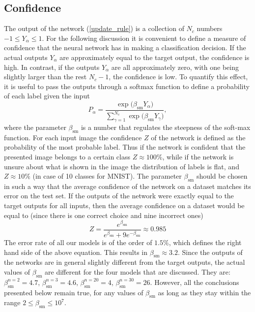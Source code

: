 \documentclass[12pt]{article} %
\begin{document}
\subsection*{Confidence}
The output of the network (\ref{update_rule}) is a collection of $N_c$ numbers $-1\leq Y_\alpha\leq 1$. For the following discussion it is convenient to define a measure of confidence that the neural network has in making a classification decision. If the actual outputs $Y_\alpha$ are approximately equal to the target output, the confidence is high. In contrast, if the outputs $Y_\alpha$ are all approximately zero, with one being slightly larger than the rest $N_c-1$, the confidence is low. To quantify this effect, it is useful to pass the outputs through a softmax function to define a probability of each label given the input
$$
P_\alpha = \frac{\exp\big(\beta_{\text{sm}} Y_\alpha\big)}{\sum\limits_{\gamma=1}^{N_c} \exp\big(\beta_{\text{sm}} Y_\gamma\big)},
$$ 
where the parameter $\beta_{\text{sm}}$ is a number that regulates the steepness of the soft-max function. For each input image the confidence $Z$ of the network is defined as the probability of the most probable label. Thus if the network is confident that the presented image belongs to a certain class $Z \approx 100\%$, while if the network is unsure about what is shown in the image the distribution of labels is flat, and $Z \approx 10\%$ (in case of 10 classes for MNIST). The parameter $\beta_{\text{sm}}$ should be chosen in such a way that the average confidence of the network on a dataset matches its error on the test set. If the outputs of the network were exactly equal to the target outputs for all inputs, then the average confidence on a dataset would be equal to (since there is one correct choice and nine incorrect ones)
$$
Z=\frac{e^{\beta_{\text{sm}}}}{e^{\beta_{\text{sm}}} + 9 e^{-\beta_{\text{sm}}}} \approx 0.985
$$
The error rate of all our models is of the order of $1.5\%$, which defines the right hand side of the above equation. This results in $\beta_{\text{sm}}\approx 3.2$.  Since the outputs of the networks are in general slightly different from the target outputs, the actual values of $\beta_{\text{sm}}$ are different for the four models that are discussed. They are: $\beta_{\text{sm}}^{n=2}=4.7$, $\beta_{\text{sm}}^{n=3}=4.6$, $\beta_{\text{sm}}^{n=20}=4$, $\beta_{\text{sm}}^{n=30}=26$. However, all the conclusions presented below remain true, for any values of $\beta_{\text{sm}}$ as long as they stay within the range $2\leq\beta_{\text{sm}}\leq 10^7$.  
\end{document}
